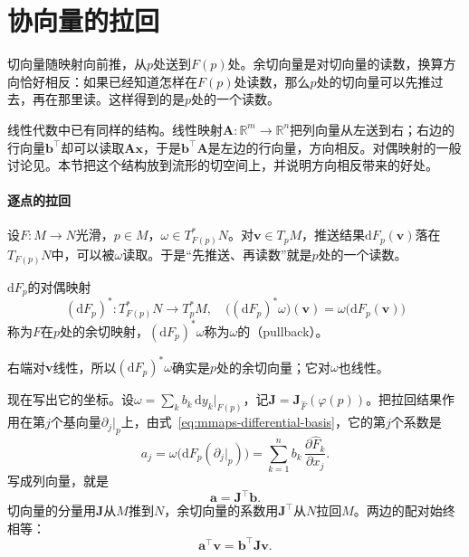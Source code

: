 \section{协向量的拉回}
\label{sec:mmaps-pullback}

切向量随映射向前推，从$p$处送到$F(p)$处。余切向量是对切向量的读数，换算方向恰好相反：如果已经知道怎样在$F(p)$处读数，那么$p$处的切向量可以先推过去，再在那里读。这样得到的是$p$处的一个读数。

线性代数中已有同样的结构。线性映射$\bm A:\mathbb R^m\to\mathbb R^n$把列向量从左送到右；右边的行向量$\bm b^\top$却可以读取$\bm A\bm x$，于是$\bm b^\top\bm A$是左边的行向量，方向相反。对偶映射的一般讨论见。本节把这个结构放到流形的切空间上，并说明方向相反带来的好处。

\paragraph{逐点的拉回}
设$F:M\to N$光滑，$p\in M$，$\omega\in T^*_{F(p)}N$。对$\bm v\in T_pM$，推送结果$\mathrm dF_p(\bm v)$落在$T_{F(p)}N$中，可以被$\omega$读取。于是“先推送、再读数”就是$p$处的一个读数。

\begin{definition}[余切向量的拉回]
\label{def:mmaps-covector-pullback}
$\mathrm dF_p$的对偶映射
\begin{equation}
(\mathrm dF_p)^*:T^*_{F(p)}N\to T^*_pM,\quad
\bigl((\mathrm dF_p)^*\omega\bigr)(\bm v)=\omega\bigl(\mathrm dF_p(\bm v)\bigr)
\label{eq:mmaps-covector-pullback}
\end{equation}
称为$F$在$p$处的余切映射，$(\mathrm dF_p)^*\omega$称为$\omega$的（pullback）。
\end{definition}

右端对$\bm v$线性，所以$(\mathrm dF_p)^*\omega$确实是$p$处的余切向量；它对$\omega$也线性。

现在写出它的坐标。设$\omega=\sum_kb_k\,\mathrm dy_k|_{F(p)}$，记$\bm J=\bm J_{\hat F}(\varphi(p))$。把拉回结果作用在第$j$个基向量$\partial_j|_p$上，由式~\eqref{eq:mmaps-differential-basis}，它的第$j$个系数是
\[
a_j=\omega\bigl(\mathrm dF_p(\partial_j|_p)\bigr)=\sum_{k=1}^nb_k\,\frac{\partial\hat F_k}{\partial x_j}.
\]
写成列向量，就是
\begin{equation}
\bm a=\bm J^\top\bm b .
\label{eq:mmaps-pullback-coordinates}
\end{equation}
切向量的分量用$\bm J$从$M$推到$N$，余切向量的系数用$\bm J^\top$从$N$拉回$M$。两边的配对始终相等：
\[
\bm a^\top\bm v=\bm b^\top\bm J\bm v .
\]

